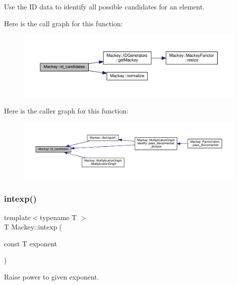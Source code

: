 Use the ID data to identify all possible candidates for an element. 

Here is the call graph for this function\+:\nopagebreak
\begin{figure}[H]
\begin{center}
\leavevmode
\includegraphics[width=350pt]{namespaceMackey_a83ac78e6d1695af40d0fa58af5255e84_cgraph}
\end{center}
\end{figure}
Here is the caller graph for this function\+:\nopagebreak
\begin{figure}[H]
\begin{center}
\leavevmode
\includegraphics[width=350pt]{namespaceMackey_a83ac78e6d1695af40d0fa58af5255e84_icgraph}
\end{center}
\end{figure}
\mbox{\label{namespaceMackey_a4904fdc0fdcf3c23d7f3b80f59b2eafa}} 
\subsubsection{\texorpdfstring{intexp()}{intexp()}}
{\footnotesize\ttfamily template$<$typename T $>$ \\
T Mackey\+::intexp (\begin{DoxyParamCaption}\item[{const T}]{exponent }\end{DoxyParamCaption})\hspace{0.3cm}{\ttfamily [inline]}}



Raise power to given exponent. 

